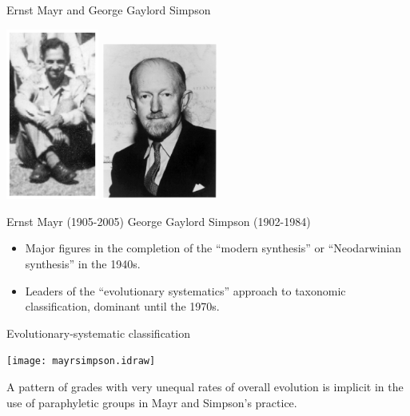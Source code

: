 \documentclass[bluish,slideColor,colorBG,pdf]{prosper}
\begin{document}
\begin{slide}[Replace]{Ernst Mayr and George Gaylord Simpson}
\vspace{-0.1in}

\centerline{\includegraphics[width=1.2in]{mayr1953.ps} \hspace{0.4in} \includegraphics[width=1.5in]{simpson.ps}}
\medskip

\centerline{\hspace*{0in}\hspace{0.2in}Ernst Mayr (1905-2005) \hspace{0.2in} George Gaylord Simpson (1902-1984)}

\begin{itemize}
\item Major figures in the completion of the ``modern synthesis'' or
``Neodarwinian
synthesis'' in the 1940s.
\item Leaders of the ``evolutionary systematics''
approach to taxonomic classification, dominant until the 1970s.
\end{itemize} 

\end{slide}

\begin{slide}[Replace]{Evolutionary-systematic classification}
\bigskip

\centerline{\texttt{[image: mayrsimpson.idraw]}}
\bigskip


A pattern of grades with very unequal rates of overall evolution is implicit
in the use of paraphyletic groups in Mayr and Simpson's practice.

\end{slide}
\end{document}
